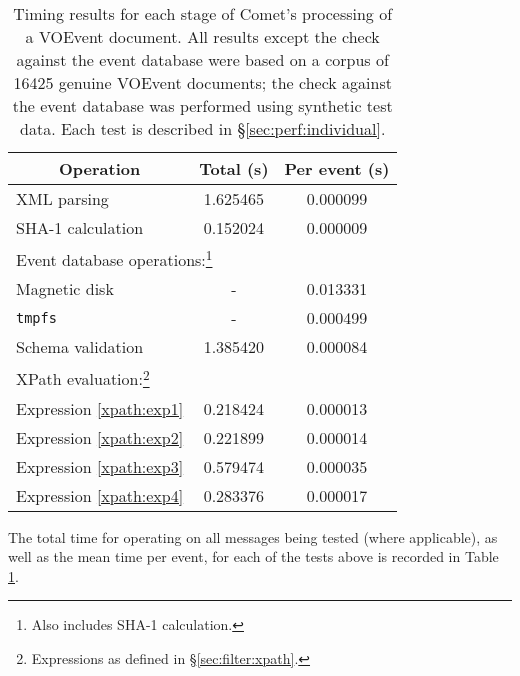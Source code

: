 \documentclass[5p,authoryear]{elsarticle}
\begin{document}
\begin{table}
\renewcommand*\footnoterule{}
\begin{minipage}{\columnwidth} %
\begin{center}

\caption{Timing results for each stage of Comet's processing of a VOEvent
document. All results except the check against the event database were based
on a corpus of 16425 genuine VOEvent documents; the check against the event
database was performed using synthetic test data. Each test is described in
\S\ref{sec:perf:individual}.}
\label{tab:perf:individual}
\begin{tabular}{lcc}
\toprule
\multicolumn{1}{c}{Operation} & \multicolumn{1}{c}{Total (s)} &\multicolumn{1}{c}{Per event (s)} \\
\midrule
XML parsing & 1.625465 & 0.000099 \\
SHA-1 calculation & 0.152024 & 0.000009 \\
\multicolumn{3}{l}{Event database operations:\footnote{Also includes SHA-1 calculation.}} \\
\hspace{4mm} Magnetic disk  & - & 0.013331 \\
\hspace{4mm} \texttt{tmpfs} & - & 0.000499 \\
Schema validation & 1.385420 & 0.000084 \\
\multicolumn{3}{l}{XPath evaluation:\footnote{Expressions as defined in \S\ref{sec:filter:xpath}.}} \\
\hspace{4mm}  Expression \ref{xpath:exp1} & 0.218424 & 0.000013 \\
\hspace{4mm}  Expression \ref{xpath:exp2} & 0.221899 & 0.000014 \\
\hspace{4mm}  Expression \ref{xpath:exp3} & 0.579474 & 0.000035 \\
\hspace{4mm}  Expression \ref{xpath:exp4} & 0.283376 & 0.000017 \\
\bottomrule
\end{tabular}
\end{center}
\end{minipage}
\end{table}

The total time for operating on all messages being tested (where applicable),
as well as the mean time per event, for each of the tests above is recorded in
Table \ref{tab:perf:individual}.
\end{document}

